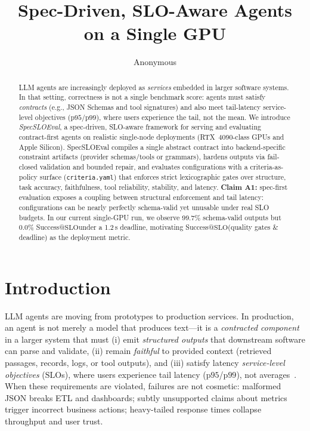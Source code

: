 \documentclass[11pt]{article}
\title{Spec-Driven, SLO-Aware Agents on a Single GPU}
\author{Anonymous}
\date{}
\newcommand{\pninetyfive}{\ensuremath{\mathrm{p95}}}
\newcommand{\pninetynine}{\ensuremath{\mathrm{p99}}}
\newcommand{\slo}{\ensuremath{\mathrm{SLO}}}
\begin{document}
\maketitle

\begin{abstract}
LLM agents are increasingly deployed as \emph{services} embedded in larger software systems.
In that setting, correctness is not a single benchmark score: agents must satisfy \emph{contracts} (e.g., JSON Schemas and tool signatures) and also meet tail-latency service-level objectives (\pninetyfive/\pninetynine), where users experience the tail, not the mean.
We introduce \emph{SpecSLOEval}, a spec-driven, SLO-aware framework for serving and evaluating contract-first agents on realistic single-node deployments (RTX~4090-class GPUs and Apple Silicon).
SpecSLOEval compiles a single abstract contract into backend-specific constraint artifacts (provider schemas/tools or grammars), hardens outputs via fail-closed validation and bounded repair, and evaluates configurations with a criteria-as-policy surface (\texttt{criteria.yaml}) that enforces strict lexicographic gates over structure, task accuracy, faithfulness, tool reliability, stability, and latency.
\textbf{Claim A1:} spec-first evaluation exposes a coupling between structural enforcement and tail latency: configurations can be nearly perfectly schema-valid yet unusable under real SLO budgets.
In our current single-GPU run, we observe 99.7\% schema-valid outputs but 0.0\% Success@\slo under a 1.2\,s deadline, motivating Success@\slo (quality gates \& deadline) as the deployment metric.
\end{abstract}

\section{Introduction}

LLM agents are moving from prototypes to production services.
In production, an agent is not merely a model that produces text---it is a \emph{contracted component} in a larger system that must (i) emit \emph{structured outputs} that downstream software can parse and validate, (ii) remain \emph{faithful} to provided context (retrieved passages, records, logs, or tool outputs), and (iii) satisfy latency \emph{service-level objectives} (\slo s), where users experience tail latency (\pninetyfive/\pninetynine), not averages~\citep{dean2013tail}.
When these requirements are violated, failures are not cosmetic: malformed JSON breaks ETL and dashboards; subtly unsupported claims about metrics trigger incorrect business actions; heavy-tailed response times collapse throughput and user trust.
\end{document}
